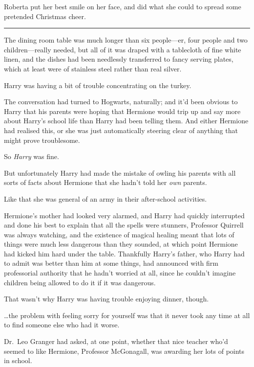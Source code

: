 Roberta put her best smile on her face, and did what she could to spread
some pretended Christmas cheer.

\begin{center}\rule{3in}{0.4pt}\end{center}

The dining room table was much longer than six people---er, four people
and two children---really needed, but all of it was draped with a
tablecloth of fine white linen, and the dishes had been needlessly
transferred to fancy serving plates, which at least were of stainless
steel rather than real silver.

Harry was having a bit of trouble concentrating on the turkey.

The conversation had turned to Hogwarts, naturally; and it'd been
obvious to Harry that his parents were hoping that Hermione would trip
up and say more about Harry's school life than Harry had been telling
them. And either Hermione had realised this, or she was just
automatically steering clear of anything that might prove troublesome.

So \emph{Harry} was fine.

But unfortunately Harry had made the mistake of owling his parents with
all sorts of facts about Hermione that she hadn't told her \emph{own}
parents.

Like that she was general of an army in their after-school activities.

Hermione's mother had looked very alarmed, and Harry had quickly
interrupted and done his best to explain that all the spells were
stunners, Professor Quirrell was always watching, and the existence of
magical healing meant that lots of things were much less dangerous than
they sounded, at which point Hermione had kicked him hard under the
table. Thankfully Harry's father, who Harry had to admit was better than
him at some things, had announced with firm professorial authority that
he hadn't worried at all, since he couldn't imagine children being
allowed to do it if it was dangerous.

That wasn't why Harry was having trouble enjoying dinner, though.

\ldots{}the problem with feeling sorry for yourself was that it never
took any time at all to find someone else who had it worse.

Dr.~Leo Granger had asked, at one point, whether that nice teacher who'd
seemed to like Hermione, Professor McGonagall, was awarding her lots of
points in school.

